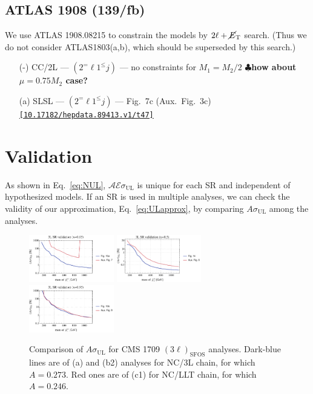 \documentclass[a4paper,10pt,captions=tableheading,DIV=14]{scrartcl}
\numberwithin{equation}{section}
\newcommand\w[1]{_{\mathrm{#1}}}
\newcommand{\TODO}[1]{{\textbf{\lstset{}\color{red}$\clubsuit$#1}}}
\newcommand\doi[1]{{\footnotesize \texttt{\href{https://doi.org/#1}{[#1]}}}}
\newcommand\mET{\cancel{E}\w T}
\begin{document}
\subsection{ATLAS 1908 (139/fb)}
We use ATLAS 1908.08215\cite{1908.08215} to constrain the models by $2\ell+\mET$ search. (Thus we do not consider ATLAS1803(a,b), which should be superseded by this search.)

\begin{itemize}
 \item [(-)] CC/2L --- $(2^=\ell1^\le j)$ --- no constraints for $M_1=M_2/2$ \TODO{how about $\mu=0.75M_2$ case?}
 \item [(a)] SLSL --- $(2^=\ell1^\le j)$ --- Fig.~7c (Aux.~Fig.~3c) \doi{10.17182/hepdata.89413.v1/t47}
\end{itemize}


\clearpage

\section{Validation}
As shown in Eq.~\eqref{eq:NUL}, $\mathcal A\mathcal E\sigma\w{UL}$ is unique for each SR and independent of hypothesized models.
If an SR is used in multiple analyses, we can check the validity of our approximation, Eq.~\eqref{eq:ULapprox}, by comparing $A\sigma\w{UL}$ among the analyses.


\begin{figure}[h]
 \includegraphics[width=0.33\textwidth]{../plots/validation_cms1709_SRA_tab1_005.pdf}
 \includegraphics[width=0.33\textwidth]{../plots/validation_cms1709_SRA_tab1_050.pdf}
 \includegraphics[width=0.33\textwidth]{../plots/validation_cms1709_SRA_tab1_095.pdf}
 \caption{\label{fig:valCMS1709}Comparison of $A\sigma\w{UL}$ for CMS 1709 $(3\ell)\w{SFOS}$ analyses. Dark-blue lines are of (a) and (b2) analyses for NC/3L chain, for which $A=0.273$. Red  ones are of (c1) for NC/LLT chain, for which $A=0.246$.}
\end{figure}
\end{document}

